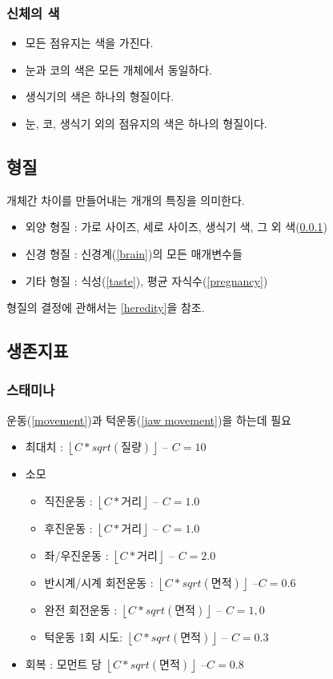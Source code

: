 \documentclass[a4paper,12pt]{article}
\newcommand{\floor}[1]{\left\lfloor{#1}\right\rfloor}
\begin{document}
\subsubsection{신체의 색}\label{body color}
\begin{itemize}
\item 모든 점유지는 색을 가진다. 
\item 눈과 코의 색은 모든 개체에서 동일하다. 
\item 생식기의 색은 하나의 형질이다. 
\item 눈, 코, 생식기 외의 점유지의 색은 하나의 형질이다.  
\end{itemize}

\subsection{형질}\label{trait}
개체간 차이를 만들어내는 개개의 특징을 의미한다.
\begin{itemize}
\item 외양 형질 : 가로 사이즈, 세로 사이즈, 생식기 색, 그 외 색(\ref{body color})
\item 신경 형질 : 신경계(\ref{brain})의 모든 매개변수들
\item 기타 형질 : 식성(\ref{taste}), 평균 자식수(\ref{pregnancy})
\end{itemize}
형질의 결정에 관해서는 \ref{heredity}을 참조. 

\subsection{생존지표 }\label{life indices}
\subsubsection{스태미나}\label{stamina}
운동(\ref{movement})과 턱운동(\ref{jaw movement})을 하는데 필요 
\begin{itemize}
\item 최대치 : $\floor{C*sqrt(\text{질량})}$ -- $C=10$
\item 소모 
\begin{itemize} 
\item 직진운동 : $\floor{C*\text{거리}}$ -- $C=1.0$
\item 후진운동 : $\floor{C*\text{거리}}$ -- $C=1.0$
\item 좌/우진운동 : $\floor{C*\text{거리}}$ -- $C=2.0$
\item 반시계/시계 회전운동 : $\floor{C*sqrt(\text{면적})}$  --$C=0.6$
\item 완전 회전운동 : $\floor{C*sqrt(\text{면적})}$ -- $C=1,0$
\item 턱운동 1회 시도: $\floor{C*sqrt(\text{면적})}$ -- $C=0.3$
\end{itemize}
\item 회복 : 모먼트 당 $\floor{C*sqrt(\text{면적})}$  --$C=0.8$
\end{itemize}
\end{document}
